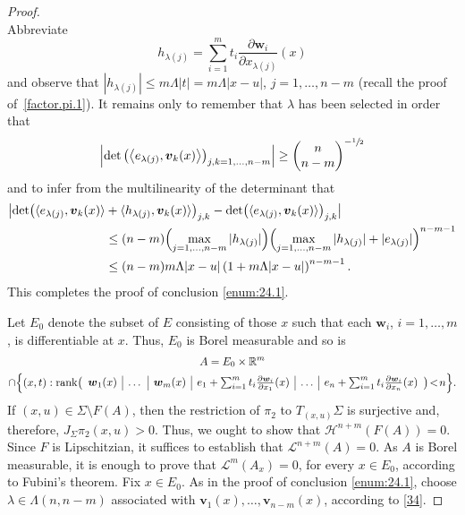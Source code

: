 \documentclass[JEP,XML,SOM,Unicode,ThmDefs,NoEqCountersInSection]{cedram}
\newcommand{\R}{\mathbb{R}}
\newcommand{\Rm}{\R^m}
\newcommand{\calH}{\mathscr{H}}
\newcommand{\calL}{\mathscr{L}}
\newcommand{\bv}{{\boldsymbol{v}}}
\newcommand{\bw}{{\boldsymbol{w}}}
\DeclareMathOperator{\rmrank}{\mathrm{rank}}
\newcommand{\bin}[2]{
\begin{pmatrix} #1 \\
#2
\end{pmatrix}}
\let\la\langle
\let\ra\rangle
\begin{document}
\begin{proof}
\begin{equation}
\end{equation}
Abbreviate
\begin{equation*}
h_{\lambda(j)} = \sum_{i=1}^m t_i \frac{\partial \bw_i}{\partial x_{\lambda(j)}}(x)
\end{equation*}
and observe that $\left| h_{\lambda(j)} \right| \leq m \Lambda |t| = m \Lambda |x-u|$, $j=1,\ldots,n-m$ (recall the proof of~\ref{factor.pi.1}).
It remains only to remember that $\lambda$ has been selected in order that
\begin{equation*}
\left| \det \left(\left\la e_{\lambda(j)}, \bv_k(x)\right\ra\right)_{j,k=1,\ldots,n-m} \right| \geq \bin{n}{n-m}^{-\sfrac{1}{2}}
\end{equation*}
and to infer from the multilinearity of the determinant that
\begin{align*}
\bigl| \det \bigl(\la e_{\lambda(j)}, \bv_k(x)\ra &+\la h_{\lambda(j)}, \bv_k(x)\ra\bigr)_{j,k} - \det \bigl(\la e_{\lambda(j)}, \bv_k(x)\ra\bigr)_{j,k}\bigr| \\
&\leq (n-m) \Bigl(\max_{j=1,\ldots,n-m} | h_{\lambda(j)}|\Bigr)\Bigl(\max_{j=1,\ldots,n-m} | h_{\lambda(j)}| + | e_{\lambda(j)}|\Bigr)^{n-m-1} \\
&\leq (n-m)m\Lambda|x-u| \left(1 + m \Lambda |x-u|\right)^{n-m-1}.
\end{align*}
This completes the proof of conclusion \eqref{enum:24.1}.
\par
Let $E_0$ denote the subset of $E$ consisting of those $x$ such that each $\bw_i$, $i=1,\ldots,m$, is differentiable at $x$.
Thus, $E_0$ is Borel measurable and so is
\begin{multline*}
A = E_0 \times \Rm\\
\cap \Bigl\{ (x,t): \rmrank
\bigl(
\begin{array}{c|c|c|c|c|c}
\bw_1(x) & \dots & \bw_m(x) & e_1 + \sum_{i=1}^m t_i \frac{\partial \bw_i}{\partial x_1}(x) & \ldots & e_n + \sum_{i=1}^m t_i \frac{\partial \bw_i}{\partial x_n}(x)
\end{array}
\bigr) \!<\! n
\Bigr\}.
\end{multline*}
If $(x,u) \in \Sigma \setminus F(A)$, then the restriction of $\pi_2$ to $T_{(x,u)}\Sigma$ is surjective and, therefore, $J_\Sigma \pi_2(x,u) > 0$.
Thus, we ought to show that $\calH^{n+m}(F(A))=0$.
Since $F$ is Lipschitzian, it suffices to establish that $\calL^{n+m}(A)=0$.
As $A$ is Borel measurable, it is enough to prove that $\calL^m(A_x)=0$, for every $x \in E_0$, according to Fubini's theorem.
Fix $x \in E_0$.
As in the proof of conclusion \eqref{enum:24.1}, choose $\lambda \in \Lambda(n,n-m)$ associated with $\bv_1(x),\ldots,\bv_{n-m}(x)$, according to \ref{34}.

\end{proof}
\end{document}
